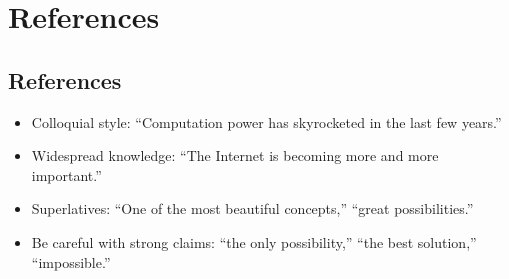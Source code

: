  
\chapter{References}
\label{appendixa}

\section{References}

\begin{itemize}
\item Colloquial style: “Computation power has skyrocketed in the last few years.”
\item Widespread knowledge: “The Internet is becoming more and more important.”
\item Superlatives: “One of the most beautiful concepts,” “great possibilities.”
\item Be careful with strong claims: “the only possibility,” “the best solution,” “impossible.”
\end{itemize}
